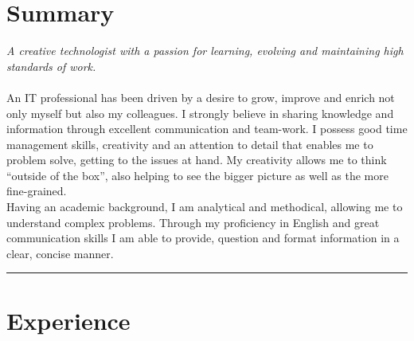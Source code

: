 \documentclass[10pt,a4paper]{article}
\begin{document}
{
	\fancyhf{}
	\setlength\headheight{43pt}
	\fancyfoot[CO]{}
}

\thispagestyle{firstpage}
\vspace*{-2.5em}

\section{Summary}
\begin{multicols}{2}
    \noindent \emph{\color{gray}\small A creative technologist with a passion for learning, evolving and maintaining high standards of work.}\\\\
    \noindent An IT professional has been driven by a desire to grow, improve and enrich not only myself but also my colleagues. I strongly believe in sharing knowledge and information through excellent communication and team-work. I possess good time management skills, creativity and an attention to detail that enables me to problem solve, getting to the issues at hand. My creativity allows me to think ``outside of the box'', also helping to see the bigger picture as well as the more fine-grained.\\

    \noindent Having an academic background, I am analytical and methodical, allowing me to understand complex problems. Through my proficiency in English and great communication skills I am able to provide, question and format information in a clear, concise manner. 
\end{multicols}

\hrule
\vspace*{2em}

\section{Experience}
\end{document}
